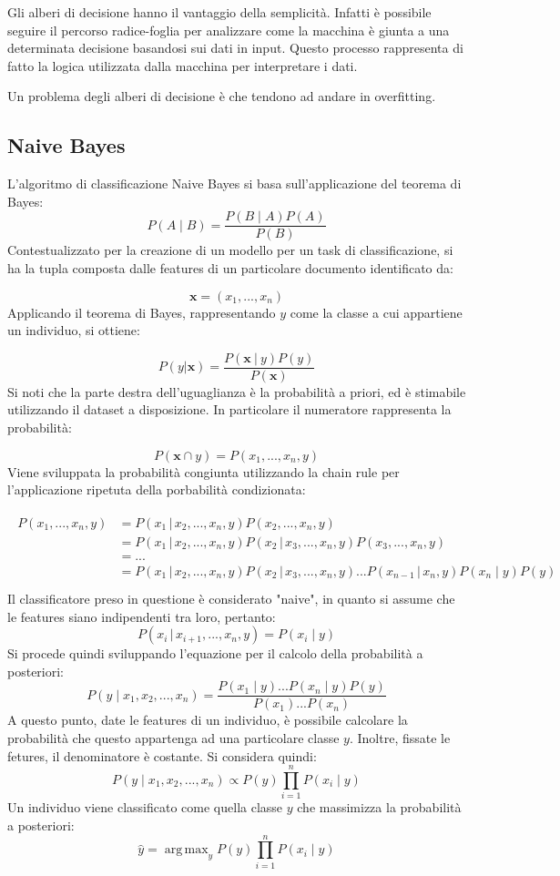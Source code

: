\documentclass[oneside]{book}
\DeclareMathOperator*{\argmax}{arg\,max}
\begin{document}
Gli alberi di decisione hanno il vantaggio della semplicità. Infatti è possibile seguire il percorso radice-foglia per analizzare come la macchina è giunta a una determinata decisione basandosi sui dati in input. Questo processo rappresenta di fatto la logica utilizzata dalla macchina per interpretare i dati.

Un problema degli alberi di decisione è che tendono ad andare in overfitting.


\subsection{Naive Bayes}
L'algoritmo di classificazione Naive Bayes si basa sull'applicazione del teorema di Bayes:
$$P(A \mid B) = \frac{P(B \mid A)P(A)}{P(B)}$$
Contestualizzato per la creazione di un modello per un task di classificazione, si ha la tupla composta dalle features di un particolare documento identificato da:

$$\textbf{x} = (x_1, ..., x_n)$$
Applicando il teorema di Bayes, rappresentando $y$ come la classe a cui appartiene un individuo, si ottiene:

$$P(y|\textbf{x}) =
\frac{P(\textbf{x}\ |\ y)P(y)}{P(\textbf{x})}$$
Si noti che la parte destra dell'uguaglianza è la probabilità a priori, ed è stimabile utilizzando il dataset a disposizione. In particolare il numeratore rappresenta la probabilità:

$$P(\textbf{x} \cap y) = P(x_1, ..., x_n, y)$$
Viene sviluppata la probabilità congiunta utilizzando la chain rule per l'applicazione ripetuta della porbabilità condizionata:




\begin{align}
\begin{split}\label{eq:1}
P(x_1, ..., x_n, y){} &=  P(x_1 \,|\, x_2, ..., x_n, y)P(x_2, ..., x_n, y)\\
&= P(x_1 \,|\, x_2, ..., x_n, y)P(x_2\, |\, x_3, ..., x_n, y)P(x_3, ..., x_n, y)\\
&= ...\\
&= P(x_1 \,|\, x_2, ..., x_n, y)P(x_2\, |\, x_3, ..., x_n, y)...P(x_{n-1}\,|\,x_n,y)P(x_n \mid y)P(y)\\
\end{split}
\end{align}
Il classificatore preso in questione è considerato "naive", in quanto si assume che le features siano indipendenti tra loro, pertanto:
$$P(x_i\,|\, x_{i+1}, ...,x_n, y) = P(x_i \mid y)$$
Si procede quindi sviluppando l'equazione per il calcolo della probabilità a posteriori:
$$P(y \mid x_1, x_2, ..., x_n) =
\frac
	{P(x_1 \mid y)...P(x_n \mid y)P(y)}
	{P(x_1)...P(x_n)}$$
A questo punto, date le features di un individuo, è possibile calcolare la probabilità che questo appartenga ad una particolare classe $y$. Inoltre, fissate le fetures, il denominatore è costante. Si considera quindi:
$$P(y \mid x_1, x_2, ..., x_n) \propto
P(y)\prod\limits_{i=1}^{n}P(x_i \mid y)
$$
Un individuo viene classificato come quella classe $y$ che massimizza la probabilità a posteriori:
$$\hat{y} = \argmax_y P(y)\prod\limits_{i=1}^{n}P(x_i \mid y)$$
\end{document}
